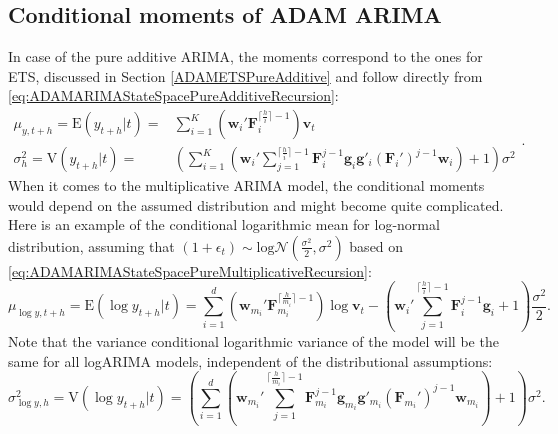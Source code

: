 \documentclass[
]{book}
\theoremstyle{definition}
\theoremstyle{definition}
\theoremstyle{definition}
\theoremstyle{definition}
\theoremstyle{remark}
\begin{document}
\hypertarget{ADAMARIMARecursiveMoments}{%
\subsection{Conditional moments of ADAM ARIMA}\label{ADAMARIMARecursiveMoments}}

In case of the pure additive ARIMA, the moments correspond to the ones for ETS, discussed in Section \ref{ADAMETSPureAdditive} and follow directly from \eqref{eq:ADAMARIMAStateSpacePureAdditiveRecursion}:
\begin{equation*}
  \begin{aligned}
    \mu_{y,t+h} = \mathrm{E}(y_{t+h}|t) = & \sum_{i=1}^K \left(\mathbf{w}_{i}' \mathbf{F}_{i}^{\lceil\frac{h}{i}\rceil-1} \right) \mathbf{v}_{t} \\
    \sigma^2_{h} = \mathrm{V}(y_{t+h}|t) = & \left( \sum_{i=1}^K \left(\mathbf{w}_{i}' \sum_{j=1}^{\lceil\frac{h}{i}\rceil-1} \mathbf{F}_{i}^{j-1} \mathbf{g}_{i} \mathbf{g}'_{i} (\mathbf{F}_{i}')^{j-1} \mathbf{w}_{i} \right) + 1 \right) \sigma^2
  \end{aligned} .
\end{equation*}
When it comes to the multiplicative ARIMA model, the conditional moments would depend on the assumed distribution and might become quite complicated. Here is an example of the conditional logarithmic mean for log-normal distribution, assuming that \((1+\epsilon_t) \sim \mathrm{log}\mathcal{N}\left(\frac{\sigma^2}{2},\sigma^2 \right)\) based on \eqref{eq:ADAMARIMAStateSpacePureMultiplicativeRecursion}:
\begin{equation}
    \mu_{\log y,t+h} = \mathrm{E}(\log y_{t+h}|t) = \sum_{i=1}^d \left(\mathbf{w}_{m_i}' \mathbf{F}_{m_i}^{\lceil\frac{h}{m_i}\rceil-1} \right) \log \mathbf{v}_{t} -\left(\mathbf{w}_{i}' \sum_{j=1}^{\lceil\frac{h}{i}\rceil-1} \mathbf{F}_{i}^{j-1} \mathbf{g}_{i} + 1\right) \frac{\sigma^2}{2} .
  \label{eq:ADAMARIMAMultiplicativeMeanLogN}
\end{equation}
Note that the variance conditional logarithmic variance of the model will be the same for all logARIMA models, independent of the distributional assumptions:
\begin{equation}
    \sigma^2_{\log y,h} = \mathrm{V}(\log y_{t+h}|t) = \left( \sum_{i=1}^d \left(\mathbf{w}_{m_i}' \sum_{j=1}^{\lceil\frac{h}{m_i}\rceil-1} \mathbf{F}_{m_i}^{j-1} \mathbf{g}_{m_i} \mathbf{g}'_{m_i} (\mathbf{F}_{m_i}')^{j-1} \mathbf{w}_{m_i} \right) + 1 \right) \sigma^2 .
  \label{eq:ADAMARIMAMultiplicativeVarianceLogN}
\end{equation}
\end{document}
